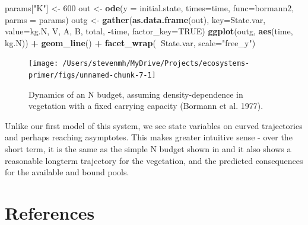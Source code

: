 \documentclass[
]{book}
\newenvironment{Shaded}{\begin{snugshade}}{\end{snugshade}}
\newcommand{\DataTypeTok}[1]{\textcolor[rgb]{0.13,0.29,0.53}{#1}}
\newcommand{\DecValTok}[1]{\textcolor[rgb]{0.00,0.00,0.81}{#1}}
\newcommand{\KeywordTok}[1]{\textcolor[rgb]{0.13,0.29,0.53}{\textbf{#1}}}
\newcommand{\NormalTok}[1]{#1}
\newcommand{\OperatorTok}[1]{\textcolor[rgb]{0.81,0.36,0.00}{\textbf{#1}}}
\newcommand{\OtherTok}[1]{\textcolor[rgb]{0.56,0.35,0.01}{#1}}
\newcommand{\StringTok}[1]{\textcolor[rgb]{0.31,0.60,0.02}{#1}}
\begin{document}
\begin{Shaded}
\begin{Highlighting}[]
\NormalTok{params[}\StringTok{"K"}\NormalTok{] <-}\StringTok{ }\DecValTok{600}
\NormalTok{out <-}\StringTok{ }\KeywordTok{ode}\NormalTok{(}\DataTypeTok{y =}\NormalTok{ initial.state, }\DataTypeTok{times=}\NormalTok{time, }\DataTypeTok{func=}\NormalTok{bormann2, }\DataTypeTok{parms =}\NormalTok{ params)}
\NormalTok{outg <-}\StringTok{ }\KeywordTok{gather}\NormalTok{(}\KeywordTok{as.data.frame}\NormalTok{(out), }\DataTypeTok{key=}\NormalTok{State.var, }\DataTypeTok{value=}\NormalTok{kg.N, }
\NormalTok{              V, A, B, total, }\OperatorTok{-}\NormalTok{time,}
              \DataTypeTok{factor_key=}\OtherTok{TRUE}\NormalTok{)}
\KeywordTok{ggplot}\NormalTok{(outg, }\KeywordTok{aes}\NormalTok{(time, kg.N)) }\OperatorTok{+}\StringTok{ }\KeywordTok{geom_line}\NormalTok{() }\OperatorTok{+}\StringTok{ }\KeywordTok{facet_wrap}\NormalTok{(}\OperatorTok{~}\NormalTok{State.var, }\DataTypeTok{scale=}\StringTok{"free_y"}\NormalTok{)}
\end{Highlighting}
\end{Shaded}

\begin{figure}
\texttt{[image: /Users/stevenmh/MyDrive/Projects/ecosystems-primer/figs/unnamed-chunk-7-1]} \caption{Dynamics of an N budget, assuming density-dependence in vegetation with a fixed carrying capacity (Bormann et al. 1977).}\label{fig:unnamed-chunk-7}
\end{figure}

Unlike our first model of this system, we see state variables on curved trajectories and perhaps reaching asymptotes. This makes greater intuitive sense - over the short term, it is the same as the simple N budget shown in \citet{Bormann1977} and it also shows a reasonable longterm trajectory for the vegetation, and the predicted consequences for the available and bound pools.

\hypertarget{references}{%
\chapter{References}\label{references}}

  
\end{document}
